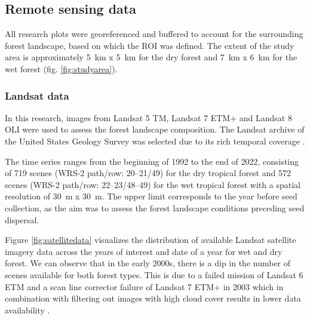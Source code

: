 \subsection{Remote sensing data}
All research plots were georeferenced and buffered to account for the surrounding forest landscape, based on which the \ac{ROI} was defined. The extent of the study area is approximately 5~km x 5~km for the dry forest and 7~km x 6~km for the wet forest (fig. \ref{fig:studyarea}).


\subsubsection{Landsat data}%
In this research, images from Landsat 5 \ac{TM}, Landsat 7 \ac{ETM+} and Landsat 8 \ac{OLI} were used to assess the forest landscape composition. The Landsat archive of the United States Geology Survey was selected due to its rich temporal coverage \citep{kennedyBringingEcologicalView2014, finerCombatingDeforestationSatellite2018}. 

The time series ranges from the beginning of 1992 to the end of 2022, consisting of 719 scenes (WRS-2 path/row: 20–21/49) for the dry tropical forest and 572 scenes (WRS-2 path/row: 22–23/48–49) for the wet tropical forest with a spatial resolution of 30~m x 30~m. The upper limit corresponds to the year before seed collection, as the aim was to assess the forest landscape conditions preceding seed dispersal.

Figure \ref{fig:satellitedata} visualizes the distribution of available Landsat satellite imagery data across the years of interest and date of a year for wet and dry forest. We can observe that in the early 2000s, there is a dip in the number of scenes available for both forest types. This is due to a failed mission of Landsat 6 \ac{ETM} and a scan line corrector failure of Landsat 7 \ac{ETM+} in 2003 which in combination with filtering out images with high cloud cover results in lower data availability \citep{gowardHistoricalRecordLandsat2006, scaramuzza2005landsat}. %

